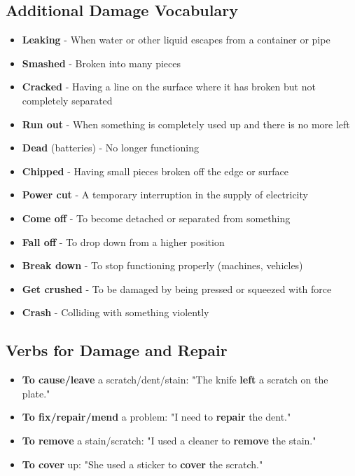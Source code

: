 \subsection{Additional Damage Vocabulary}

\begin{vocabbox}[title=More Damage and Problems]
\begin{itemize}
    \item \textbf{Leaking} - When water or other liquid escapes from a container or pipe
    \item \textbf{Smashed} - Broken into many pieces
    \item \textbf{Cracked} - Having a line on the surface where it has broken but not completely separated
    \item \textbf{Run out} - When something is completely used up and there is no more left
    \item \textbf{Dead} (batteries) - No longer functioning
    \item \textbf{Chipped} - Having small pieces broken off the edge or surface
    \item \textbf{Power cut} - A temporary interruption in the supply of electricity
    \item \textbf{Come off} - To become detached or separated from something
    \item \textbf{Fall off} - To drop down from a higher position
    \item \textbf{Break down} - To stop functioning properly (machines, vehicles)
    \item \textbf{Get crushed} - To be damaged by being pressed or squeezed with force
    \item \textbf{Crash} - Colliding with something violently
\end{itemize}
\end{vocabbox}

\subsection{Verbs for Damage and Repair}

\begin{itemize}
    \item \textbf{To cause/leave} a scratch/dent/stain: "The knife \textbf{left} a scratch on the plate."
    \item \textbf{To fix/repair/mend} a problem: "I need to \textbf{repair} the dent."
    \item \textbf{To remove} a stain/scratch: "I used a cleaner to \textbf{remove} the stain."
    \item \textbf{To cover} up: "She used a sticker to \textbf{cover} the scratch."
\end{itemize}

